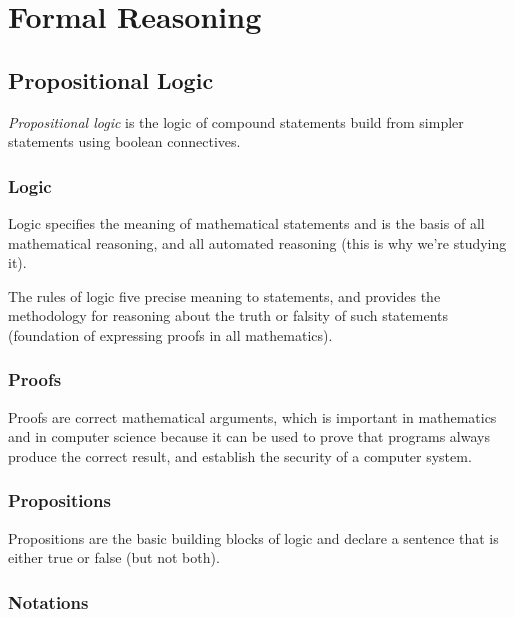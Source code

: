 \section{Formal Reasoning}\label{sec:formal_reasoning}

\subsection{Propositional Logic}\label{sub:propositional_logic}

\emph{Propositional logic} is the logic of compound statements build from simpler statements using boolean connectives.

\subsubsection{Logic}\label{ssub:logic_propositional}

Logic specifies the meaning of mathematical statements and is the basis of all mathematical reasoning, and all automated reasoning (this is why we're studying it).

The rules of logic five precise meaning to statements, and provides the methodology for reasoning about the truth or falsity of such statements (foundation of expressing proofs in all mathematics).

\subsubsection{Proofs}\label{ssub:proofs_propositional}

Proofs are correct mathematical arguments, which is important in mathematics and in computer science because it can be used to prove that programs always produce the correct result, and establish the security of a computer system.

\subsubsection{Propositions}\label{ssub:propositions}

Propositions are the basic building blocks of logic and declare a sentence that is either true or false (but not both).

\subsubsection{Notations}\label{ssub:notations_propositions}

